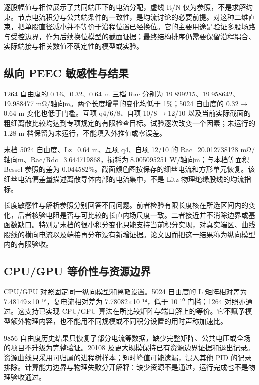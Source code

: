 \documentclass[journal,10pt]{IEEEtran}
\begin{document}
逐股幅值与相位展示了共同端压下的电流分配，虚线 It/N 仅为参照，不是求解约束。节点电流积分与公共端条件的一致性，是均流讨论的必要前提。对这种二维直束，把单股直径减小并不等价于沿程位置已经换位。它的主要用途是验证多股场路与受控边界，作为后续换位模型的截面证据；最终结构排序仍需要保留沿程耦合、实际端接与相关数值不确定性的模型或实验。


\subsection*{纵向 PEEC 敏感性与结果}
\hypertarget{03.peec_results.heading}{}
1264 自由度的 0.16、0.32、0.64 m 三档 Rac 分别为 19.899215、19.958642、19.988477 mΩ/轴向m。两个长度增量的变化均低于 1\%；5024 自由度的 0.32\(\to\)0.64 m 变化也低于门槛。互项 q4/6/8、自项 10/8\(\to\)12/10 以及当前实际截面的粗细离散比较均达到专项规定的有限检查目标。试验逐次改变一个因素；未运行的 1.28 m 档保留为未运行，不能填入外推值或零误差。


末档 5024 自由度、Lz=0.64 m、互项 q4、自项 12/10 的 Rac=20.012738128 mΩ/轴向m、Rac/Rdc=3.644719868，损耗为 8.005095251 W/轴向m；与本档等面积 Bessel 参照的差为 0.044582\%。截面颜色图按保存的细丝电流和方形单元恢复。该细丝电流偏差量描述离散导体内部的电流集中，不是 Litz 物理绝缘股线的均流指标。


长度敏感性与解析参照分别回答不同问题。前者检验有限长度核在所选区间内的变化，后者核验电阻是否与可比较的长直内场尺度一致。二者接近并不消除边界或基函数缺口。特别是末档的很小积分变化只能支持当前积分实现，对真实端区、曲线股线的横向电流以及端接再分布没有新增证据。论文因而把这一结果称为纵向模型内的有限验收。


\subsection*{CPU/GPU 等价性与资源边界}
\hypertarget{03.compute.heading}{}
CPU/GPU 对照固定同一纵向模型和离散设置。5024 自由度的 L 矩阵相对差为 7.48149×10⁻¹⁶，复电流相对差为 7.78082×10⁻¹⁴，低于 10⁻¹⁰ 门槛；1264 对照亦通过。这支持已实现 CPU/GPU 算法在所比较矩阵与端口解上的等价。它不赋予模型额外物理内容，也不能用不同规模或不同积分设置的用时声称加速比。


9856 自由度历史结果只恢复了部分电流等数据，缺少完整矩阵、公共电压或全场的项目不升级为完整验证。20108 及更大规模保持已有资源边界证据和退出记录。资源曲线只采用可归属的进程树样本；短时峰值可能遗漏，混入其他 PID 的记录排除。计算能力边界与物理失败分开解释：缺少资源不是通过，运行完成也不是物理验收通过。
\end{document}

